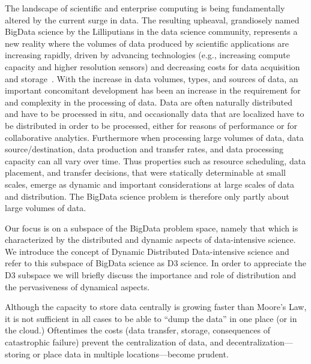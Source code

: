 The landscape of scientific and enterprise
computing is being fundamentally altered by the current surge in data. The
resulting upheaval, grandiosely named BigData science by the Lilliputians
in the data science community, represents a new reality where
the volumes of data produced by scientific applications are increasing
rapidly, driven by advancing technologies (e.g., increasing compute
capacity and higher resolution sensors) and decreasing costs for data
acquisition and storage~\cite{tony-propaganda}. With the increase in data
volumes, types, and sources of data, an important concomitant
development has been an increase in the requirement for and complexity
in the processing of data. Data are often naturally distributed and have
to be processed in situ, and occasionally data that are localized
have to be distributed in order to be processed, either for reasons
of performance or for collaborative analytics.  Furthermore when
processing large volumes of data, data source/destination, data
production and transfer rates, and data processing capacity can
all vary over time. Thus properties such as resource scheduling, data
placement, and transfer decisions, that were statically determinable at
small scales, emerge as dynamic and important considerations at
large scales of data and distribution.  The BigData science problem
is therefore only partly about large volumes of data.

Our focus is on a subspace of the BigData problem space, namely that
which is characterized by the distributed and dynamic aspects of
data-intensive science. We introduce the concept of Dynamic
Distributed Data-intensive science and refer to this subspace of
BigData science as D3 science.  In order to appreciate the D3 subspace
we will briefly discuss the importance and role of distribution and
the pervasiveness of dynamical aspects.



Although the capacity to store data centrally is
growing faster than Moore's Law, it is not sufficient in all cases to
be able to ``dump the data'' in one place (or in the cloud.)
Oftentimes the costs (data transfer, storage, consequences of
catastrophic failure) prevent the centralization of data, and
decentralization---storing or place data in multiple locations---become prudent.

